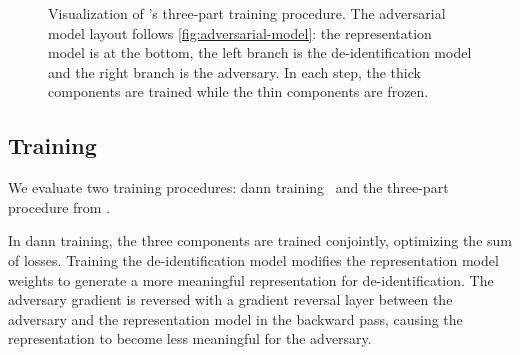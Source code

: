 
 \begin{figure}
    \centering
    
    \caption[Adversarial training procedure]{%
        Visualization of \citeauthor{feutry2018learning}'s three-part training procedure.
        The adversarial model layout follows \cref{fig:adversarial-model}: the representation model is at the bottom, the left branch is the de-identification model and the right branch is the adversary.
        In each step, the thick components are trained while the thin components are frozen.
    }\label{fig:feutry-training}
\end{figure}

\subsection{Training}
%
We evaluate two training procedures: \ac{dann} training~\citep{ganin2016domain} and the three-part procedure from \citet{feutry2018learning}.

%
In \ac{dann} training, the three components are trained conjointly, optimizing the sum of losses.
%
Training the de-identification model modifies the representation model weights to generate a more meaningful representation for de-identification.
%
The adversary gradient is reversed with a gradient reversal layer between the adversary and the representation model in the backward pass, causing the representation to become less meaningful for the adversary.

